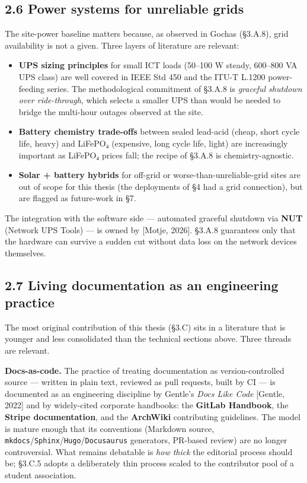 \hypertarget{power-systems-for-unreliable-grids}{%
\subsection{2.6 Power systems for unreliable
grids}\label{power-systems-for-unreliable-grids}}

The site-power baseline matters because, as observed in Gochas (§3.A.8),
grid availability is not a given. Three layers of literature are
relevant:

\begin{itemize}
\tightlist
\item
  \textbf{UPS sizing principles} for small ICT loads (50--100 W steady,
  600--800 VA UPS class) are well covered in IEEE Std 450 and the ITU-T
  L.1200 power-feeding series. The methodological commitment of §3.A.8
  is \emph{graceful shutdown over ride-through}, which selects a smaller
  UPS than would be needed to bridge the multi-hour outages observed at
  the site.
\item
  \textbf{Battery chemistry trade-offs} between sealed lead-acid (cheap,
  short cycle life, heavy) and LiFePO₄ (expensive, long cycle life,
  light) are increasingly important as LiFePO₄ prices fall; the recipe
  of §3.A.8 is chemistry-agnostic.
\item
  \textbf{Solar + battery hybrids} for off-grid or
  worse-than-unreliable-grid sites are out of scope for this thesis (the
  deployments of §4 had a grid connection), but are flagged as
  future-work in §7.
\end{itemize}

The integration with the software side --- automated graceful shutdown
via \textbf{NUT} (Network UPS Tools) --- is owned by {[}Motje, 2026{]}.
§3.A.8 guarantees only that the hardware can survive a sudden cut
without data loss on the network devices themselves.

\hypertarget{living-documentation-as-an-engineering-practice}{%
\subsection{2.7 Living documentation as an engineering
practice}\label{living-documentation-as-an-engineering-practice}}

The most original contribution of this thesis (§3.C) sits in a
literature that is younger and less consolidated than the technical
sections above. Three threads are relevant.

\textbf{Docs-as-code.} The practice of treating documentation as
version-controlled source --- written in plain text, reviewed as pull
requests, built by CI --- is documented as an engineering discipline by
Gentle's \emph{Docs Like Code} {[}Gentle, 2022{]} and by widely-cited
corporate handbooks: the \textbf{GitLab Handbook}, the \textbf{Stripe
documentation}, and the \textbf{ArchWiki} contributing guidelines. The
model is mature enough that its conventions (Markdown source,
\texttt{mkdocs}/\texttt{Sphinx}/\texttt{Hugo}/\texttt{Docusaurus}
generators, PR-based review) are no longer controversial. What remains
debatable is \emph{how thick} the editorial process should be; §3.C.5
adopts a deliberately thin process scaled to the contributor pool of a
student association.

